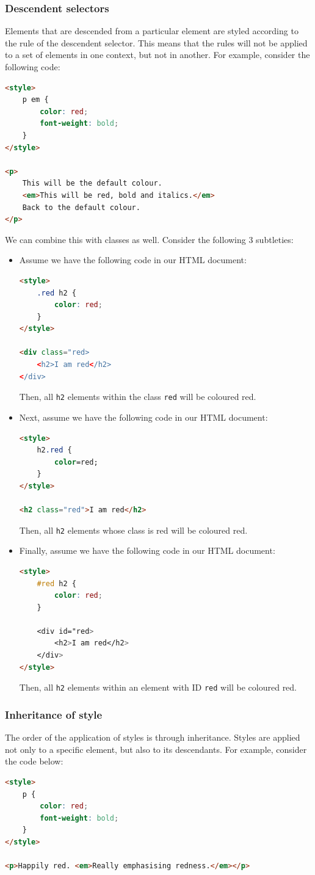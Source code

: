 \documentclass[a4paper, openany]{memoir}
\begin{document}
\subsubsection{Descendent selectors}
Elements that are descended from a particular element are styled according to the rule of the descendent selector. This means that the rules will not be applied to a set of elements in one context, but not in another. For example, consider the following code:
\begin{lstlisting}[language=html]
<style>
    p em {
        color: red;
        font-weight: bold;
    }
</style>

<p>
    This will be the default colour.
    <em>This will be red, bold and italics.</em>
    Back to the default colour.
</p>
\end{lstlisting}
We can combine this with classes as well. Consider the following 3 subtleties:
\begin{itemize}
    \item Assume we have the following code in our HTML document:
    \begin{lstlisting}[language=html]
<style>
    .red h2 {
        color: red;
    }
</style>

<div class="red>
    <h2>I am red</h2>
</div>\end{lstlisting}
    Then, all \texttt{h2} elements within the class \texttt{red} will be coloured red.
    \item Next, assume we have the following code in our HTML document:
    \begin{lstlisting}[language=html]
<style>
    h2.red {
        color=red;
    }
</style>

<h2 class="red">I am red</h2>\end{lstlisting}
    Then, all \texttt{h2} elements whose class is red will be coloured red.
    \item Finally, assume we have the following code in our HTML document:
    \begin{lstlisting}[language=html]
<style>
    #red h2 {
        color: red;
    }
    
    <div id="red>
        <h2>I am red</h2>
    </div>
</style>
    \end{lstlisting}
    Then, all \texttt{h2} elements within an element with ID \texttt{red} will be coloured red.
\end{itemize}

\subsubsection{Inheritance of style}
The order of the application of styles is through inheritance. Styles are applied not only to a specific element, but also to its descendants. For example, consider the code below:
\begin{lstlisting}[language=html]
<style>
    p {
        color: red;
        font-weight: bold;
    }
</style>

<p>Happily red. <em>Really emphasising redness.</em></p>
\end{lstlisting}
\end{document}

